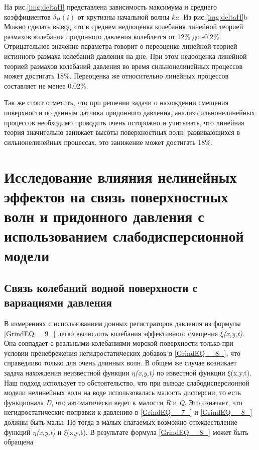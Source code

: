 На рис.\ref{img:deltaH} представлена зависимость максимума и среднего коэффициентов $\delta_H(i)$  от крутизны начальной волны $ka$. Из рис.\ref{img:deltaH}b Можно сделать вывод что в среднем недооценка колебания линейной теорией размахов колебания придонного давления колеблется от 12\% до -0.2\%. Отрицательное значение параметра   говорит о переоценке линейной теорией истинного размаха колебаний давления на дне. При этом недооценка линейной теорией размахов колебаний давления во время сильнонелинейных процессов может достигать 18\%. Переоценка же относительно линейных процессов составляет не менее 0.02\%.

Так же стоит отметить, что при решении задачи о нахождении смещения поверхности по данным датчика придонного давления, анализ сильнонелинейных процессов необходимо проводить очень осторожно и учитывать, что линейная теория значительно занижает высоты поверхностных волн, развивающихся в сильнонелинейных процессах, это занижение может достигать 18\%.

\section{Исследование влияния нелинейных эффектов на связь поверхностных волн и придонного давления с использованием слабодисперсионной модели}

\subsection{Связь колебаний водной поверхности с вариациями давления}

В измерениях с использованием донных регистраторов давления из формулы \eqref{GrindEQ__9_} легко вычислить колебания эффективного смещения \textit{$\xi$(x,y,t)}. Она совпадает с реальными колебаниями морской поверхности только при условии пренебрежения негидростатических добавок в \eqref{GrindEQ__8_}, что справедливо только для очень длинных волн. В общем же случае возникает задача нахождения неизвестной функции \textit{$\eta$(x,y,t)} по известной функции $\xi$(x,y,t). Наш подход использует то обстоятельство, что при выводе слабодисперсионной модели нелинейных волн на воде использовалась малость дисперсии, то есть функционала \textit{D}, что автоматически ведет к малости \textit{R} и \textit{Q}. Это означает, что негидростатические поправки к давлению в \eqref{GrindEQ__7_} и \eqref{GrindEQ__8_} должны быть малы. Но тогда в малых слагаемых возможно отождествление функций \textit{$\eta$(x,y,t)} и $\xi$(x,y,t). В результате формула \eqref{GrindEQ__8_} может быть обращена

